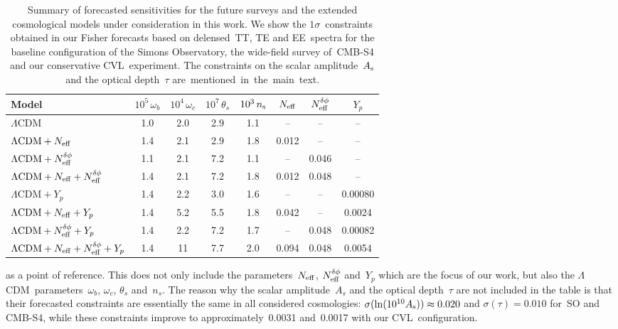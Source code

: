 \begin{subappendices}
\begin{table}
\begin{subtable}{\textwidth}
		\begin{tabular}{l c c c c c c c}
				\toprule
			Model											& {$10^{5}\,\omega_b$}	& {$10^{4}\,\omega_c$}	& {$10^{7}\,\theta_s$}	& {$10^{3}\,n_\mathrm{s}$}	& {$N_\mathrm{eff}$}	& {$N_\mathrm{eff}^{\delta\phi}$}	& {$Y_p$}	\\
				\midrule[0.065em]
			$\Lambda\mathrm{CDM}$							& 1.0						& 2.0						& 2.9						& 1.1				& {--}		& {--}			& {--}		\\
			$\Lambda\mathrm{CDM} + N_\mathrm{eff}$					& 1.4						& 2.1						& 2.9						& 1.8				& 0.012		& {--} 			& {--}		\\
			$\Lambda\mathrm{CDM} + N_\mathrm{eff}^{\delta\phi}$					& 1.1						& 2.1						& 7.2						& 1.1				& {--}		& 0.046			& {--}		\\
			$\Lambda\mathrm{CDM} + N_\mathrm{eff} + N_\mathrm{eff}^{\delta\phi}$			& 1.4						& 2.1						& 7.2						& 1.8				& 0.012		& 0.048			& {--}		\\
			$\Lambda\mathrm{CDM} + Y_p$						& 1.4						& 2.2						& 3.0						& 1.6				& {--}		& {--}			& 0.00080	\\
			$\Lambda\mathrm{CDM} + N_\mathrm{eff} + Y_p$				& 1.4						& 5.2						& 5.5						& 1.8				& 0.042		& {--} 			& 0.0024	\\
			$\Lambda\mathrm{CDM} + N_\mathrm{eff}^{\delta\phi} + Y_p$			& 1.4						& 2.2						& 7.2						& 1.7				& {--}		& 0.048			& 0.00082	\\
			$\Lambda\mathrm{CDM} + N_\mathrm{eff} + N_\mathrm{eff}^{\delta\phi} + Y_p$	& 1.4						& 11						& 7.7						& 2.0				& 0.094		& 0.048			& 0.0054	\\
				\bottomrule
		\end{tabular}
	
		\caption[Comprehensive forecasted sensitivities for future CMB surveys]{Cosmic-variance-limited experiment}
\end{subtable}
	\caption[Comprehensive forecasted sensitivities for future CMB surveys]{Summary of forecasted sensitivities for the future surveys and the extended cosmological models under consideration in this work. We show the $1\sigma$~constraints obtained in our Fisher forecasts based on delensed~TT, TE and EE~spectra for the baseline configuration of the Simons Observatory, the wide-field survey of~\mbox{CMB-S4} and our conservative CVL~experiment. The constraints on the scalar amplitude~$A_\mathrm{s}$ and the optical depth~$\tau$ \mbox{are mentioned in the main text.}}
	\label{ch12-tab:forecasts_all}
\end{table}
as a point of reference. This does not only include the parameters~$N_\mathrm{eff}$, $N_\mathrm{eff}^{\delta\phi}$ and~$Y_p$ which are the focus of our work, but also the $\Lambda$CDM~parameters~$\omega_b$, $\omega_c$, $\theta_s$ and~$n_s$. The reason why the scalar amplitude~$A_s$ and the optical depth~$\tau$ are not included in the table is that their forecasted constraints are essentially the same in all considered cosmologies: $\sigma(\ln(10^{10}A_\mathrm{s})) \approx 0.020$ and $\sigma(\tau) = 0.010$ for~SO and \mbox{CMB-S4}, while these constraints improve to approximately~0.0031 and~0.0017 with our CVL~configuration.


\end{subappendices}
